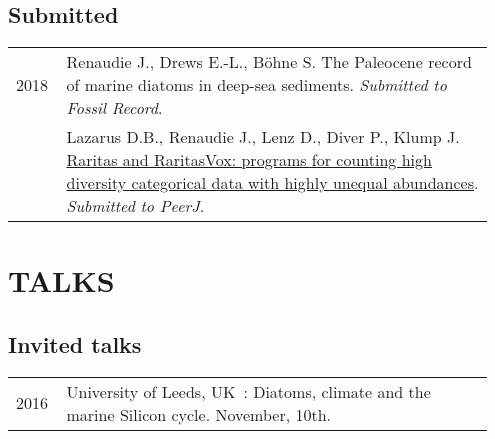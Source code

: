 \documentclass[11pt, a4paper]{article}
\begin{document}
\subsection{Submitted}
\begin{longtable}{p{0.1\linewidth} P{0.85\linewidth}}
2018 & Renaudie J., Drews E.-L., B\"{o}hne S. The Paleocene record of marine diatoms in deep-sea sediments. \emph{Submitted to Fossil Record}.\\
 & Lazarus D.B., Renaudie J., Lenz D., Diver P., Klump J. \href{https://peerj.com/preprints/26836}{Raritas and RaritasVox: programs for counting high diversity categorical data with highly unequal abundances}. \emph{Submitted to PeerJ}.\\
\end{longtable}


\section{TALKS}
\subsection{Invited talks}
\begin{longtable}{p{0.1\linewidth} P{0.85\linewidth}}
2016 & University of Leeds, UK : Diatoms, climate and the marine Silicon cycle. November, 10th.\\
\end{longtable}
\end{document}
